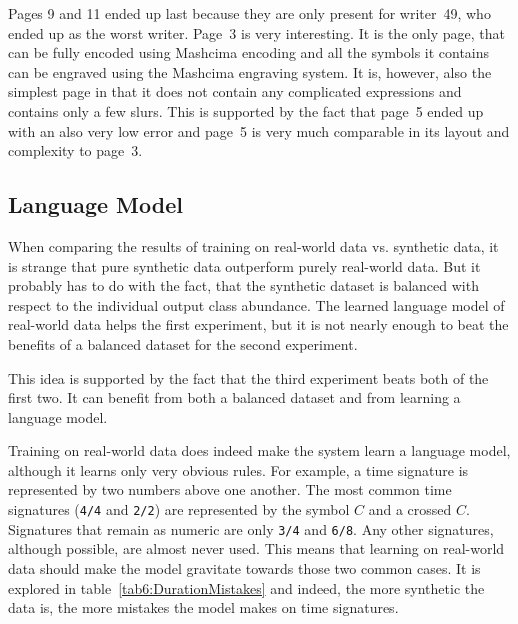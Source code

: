 Pages 9 and 11 ended up last because they are only present for writer~49, who ended up as the worst writer. Page~3 is very interesting. It is the only page, that can be fully encoded using Mashcima encoding and all the symbols it contains can be engraved using the Mashcima engraving system. It is, however, also the simplest page in that it does not contain any complicated expressions and contains only a few slurs. This is supported by the fact that page~5 ended up with an also very low error and page~5 is very much comparable in its layout and complexity to page~3.

\newpage


\subsection{Language Model}
\label{sec:LanguageModel}

When comparing the results of training on real-world data vs. synthetic data, it is strange that pure synthetic data outperform purely real-world data. But it probably has to do with the fact, that the synthetic dataset is balanced with respect to the individual output class abundance. The learned language model of real-world data helps the first experiment, but it is not nearly enough to beat the benefits of a balanced dataset for the second experiment.

This idea is supported by the fact that the third experiment beats both of the first two. It can benefit from both a balanced dataset and from learning a language model.

Training on real-world data does indeed make the system learn a language model, although it learns only very obvious rules. For example, a time signature is represented by two numbers above one another. The most common time signatures (\texttt{4/4} and \texttt{2/2}) are represented by the symbol $C$ and a crossed $C$. Signatures that remain as numeric are only \texttt{3/4} and \texttt{6/8}. Any other signatures, although possible, are almost never used. This means that learning on real-world data should make the model gravitate towards those two common cases. It is explored in table~\ref{tab6:DurationMistakes} and indeed, the more synthetic the data is, the more mistakes the model makes on time signatures.

